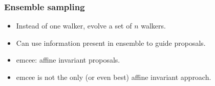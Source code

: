 \documentclass[%
]{beamer}
\begin{document}
\begin{frame}
  \frametitle{Ensemble sampling} 
  \begin{itemize}
      \pause\item Instead of one walker, evolve a set of $n$ walkers.
      \pause\item Can use information present in ensemble to guide proposals.
      \pause\item emcee: affine invariant proposals.
      \pause\item emcee is not the only (or even best) affine invariant approach.
  \end{itemize}
\end{frame}

%
%
%
%
% 
\end{document}
